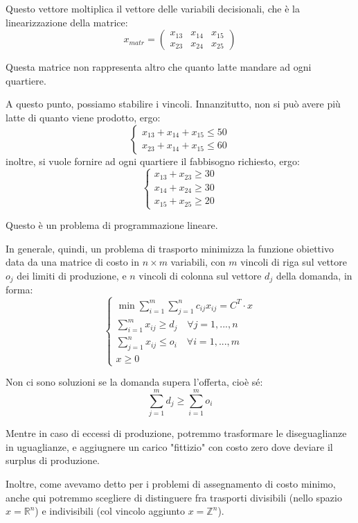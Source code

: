 \documentclass[a4paper,11pt]{article}
\begin{document}
Questo vettore moltiplica il vettore delle variabili decisionali, che è la linearizzazione della matrice:
$$
x_{matr} =
\begin{pmatrix}
	x_{13} & x_{14} & x_{15} \\ 
	x_{23} & x_{24} & x_{25}
\end{pmatrix}
$$

Questa matrice non rappresenta altro che quanto latte mandare ad ogni quartiere.

A questo punto, possiamo stabilire i vincoli.
Innanzitutto, non si può avere più latte di quanto viene prodotto, ergo:
\[
	\begin{cases}
		x_{13} + x_{14} + x_{15} \leq 50 \\ 
		x_{23} + x_{14} + x_{15} \leq 60
	\end{cases}
\]
inoltre, si vuole fornire ad ogni quartiere il fabbisogno richiesto, ergo:
\[
	\begin{cases}
		x_{13} + x_{23} \geq 30 \\	
		x_{14} + x_{24} \geq 30	\\
		x_{15} + x_{25} \geq 20	
	\end{cases}
\]

Questo è un problema di programmazione lineare.

In generale, quindi, un problema di trasporto minimizza la funzione obiettivo data da una matrice di costo in $n \times m$ variabili, con $m$ vincoli di riga sul vettore $o_j$ dei limiti di produzione, e $n$ vincoli di colonna sul vettore $d_j$ della domanda, in forma:
\[
	\begin{cases}
		\min{\sum^m_{i=1} \sum^n_{j=1} c_{ij}x_{ij}} = C^T \cdot x \\
		\sum^m_{i=1} x_{ij} \geq d_{j} \quad \forall j = 1,...,n \\ 
		\sum^n_{j=1} x_{ij} \leq o_{i} \quad \forall i = 1,...,m \\ 
		x \geq 0
	\end{cases}
\]

Non ci sono soluzioni se la domanda supera l'offerta, cioè sé:
$$
\sum_{j=1}^m d_j \geq \sum_{i=1}^m o_i
$$

Mentre in caso di eccessi di produzione, potremmo trasformare le diseguaglianze in uguaglianze, e aggiugnere un carico "fittizio" con costo zero dove deviare il surplus di produzione.

Inoltre, come avevamo detto per i problemi di assegnamento di costo minimo, anche qui potremmo scegliere di distinguere fra trasporti divisibili (nello spazio $x = \mathbb{R}^n$) e indivisibili (col vincolo aggiunto $x = \mathbb{Z}^n$).
\end{document}
